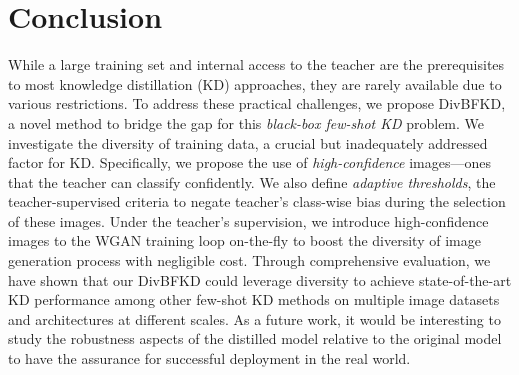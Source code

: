 \section{Conclusion} \label{sec:35-research01-conclusion}

\begin{foldable}
    While a large training set and internal access to the teacher are the prerequisites to most knowledge distillation (KD) approaches, they are rarely available due to various restrictions.
    To address these practical challenges, we propose DivBFKD, a novel method to bridge the gap for this \textit{black-box few-shot KD} problem.
    We investigate the diversity of training data, a crucial but inadequately addressed factor for KD.
    Specifically, we propose the use of \textit{high-confidence} images---ones that the teacher can classify confidently.
    We also define \textit{adaptive thresholds}, the teacher-supervised criteria to negate teacher's class-wise bias during the selection of these images.
    Under the teacher's supervision, we introduce high-confidence images to the WGAN training loop on-the-fly to boost the diversity of image generation process with negligible cost.
    Through comprehensive evaluation, we have shown that our DivBFKD could leverage diversity to achieve state-of-the-art KD performance among other few-shot KD methods on multiple image datasets and architectures at different scales.
    As a future work, it would be interesting to study the robustness aspects of the distilled model relative to the original model to have the assurance \cite{gopakumar2018algorithmic} for successful deployment in the real world.
\end{foldable}
